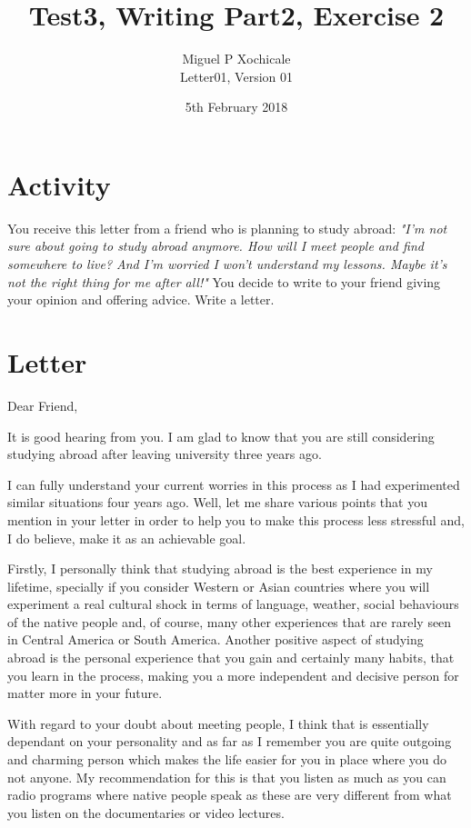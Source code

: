 \documentclass[10pt]{article}
\title{Test3, Writing Part2, Exercise 2}
\author{Miguel P Xochicale \\
Letter01, Version 01}
\date{5th February 2018}
\begin{document}
\maketitle
\thispagestyle{empty} %


\section{Activity}
You receive this letter from a friend who is planning to study abroad:
\textit{
"I'm not sure about going to study abroad anymore. How will I meet people
and find somewhere to live? And I'm worried I won't understand my lessons.
Maybe it's not the right thing for me after all!"}
You decide to write to your friend giving your opinion and offering advice.
Write a letter. 

\section{Letter}


Dear Friend,

It is good hearing from you. I am glad to know that you are still considering
studying abroad after leaving university three years ago.

I can fully understand your current worries in this process as 
I had experimented similar situations four years ago. Well, let me share
various points that you mention in your letter in order to help you to make 
this process less stressful and, I do believe, make it as an achievable goal.

Firstly, I personally think that studying abroad is the best experience in my 
lifetime, specially if you consider Western or Asian countries where 
you will experiment a real cultural shock in terms of language, weather, 
social behaviours of the native people and, of course, many other experiences 
that are rarely seen in Central America or South America. 
Another positive aspect of studying abroad is the personal experience that you 
gain and certainly many habits, that you learn in the process, making you a 
more independent and decisive person for matter more in your future.

With regard to your doubt about meeting people, I think that is essentially 
dependant on your personality and as far as I remember you are quite outgoing and 
charming person which makes the life easier for you in place where you do not
anyone. My recommendation for this is that you listen as much as you can 
radio programs where native people speak as these are very different from 
what you listen on the documentaries or video lectures.
\end{document}
